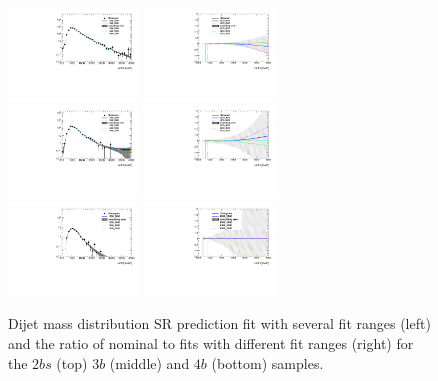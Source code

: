 \begin{figure}[htb!]
\begin{center}
\includegraphics[width=0.31\textwidth,angle=-90]{figures/boosted/Syst_Smooth/smoothFuncRangeCompare_22_comp.pdf}
\includegraphics[width=0.31\textwidth,angle=-90]{figures/boosted/Syst_Smooth/smoothFuncRangeCompare_22_comp_ratio.pdf} \\
\includegraphics[width=0.31\textwidth,angle=-90]{figures/boosted/Syst_Smooth/smoothFuncRangeCompare_33_comp.pdf}
\includegraphics[width=0.31\textwidth,angle=-90]{figures/boosted/Syst_Smooth/smoothFuncRangeCompare_33_comp_ratio.pdf} \\
\includegraphics[width=0.31\textwidth,angle=-90]{figures/boosted/Syst_Smooth/smoothFuncRangeCompare_44_comp.pdf}
\includegraphics[width=0.31\textwidth,angle=-90]{figures/boosted/Syst_Smooth/smoothFuncRangeCompare_44_comp_ratio.pdf} \\
\caption{Dijet mass distribution SR prediction fit with several fit ranges (left) and the ratio of nominal to fits with different fit ranges (right)  for the $2bs$ (top) $3b$ (middle) and $4b$ (bottom) samples.}
\label{fig:qcd_fit_range_sys_ratio-scaled}
\end{center}
\end{figure}

